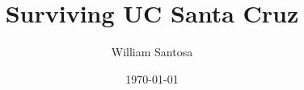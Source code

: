 \documentclass[12pt, letterpaper, titlepage]{article}
\title{Surviving UC Santa Cruz}
\author{William Santosa}
\date{\today}
\begin{document}
\begin{titlepage}
  \maketitle
\end{titlepage}

\pagebreak
\end{document}

